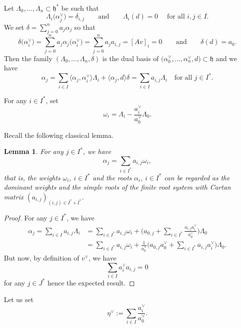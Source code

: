 \documentclass[pdftex]{sigma}
\newtheorem{Lemma}[Theorem]{Lemma}
\numberwithin{equation}{section}
\newcommand{\al}{\alpha}
\newcommand{\La}{\Lambda}
\newcommand{\fh}{\mathfrak{h}}
\newcommand{\scal}[2]{\langle #1,#2\rangle}
\begin{document}
Let $\La_0,\dots,\La_{n}\subset \fh^\ast$ be such that
\[
\La_i\bigl(\al^\vee_j\bigr) = \delta_{i,j} \qquad\text{and}\qquad \La_i(d) = 0\quad \text{ for all $i,j\in I$.}
\]
We set $\delta = \sum_{j=0}^{n} a_j \al_j$ so that
\[
\delta\bigl(\al_i^\vee\bigr) = \sum_{j=0}^n a_j \al_j\bigl(\al_i^\vee\bigr)=\sum_{j=0}^n a_j a_{i,j} = [Av]_{i} =0\qquad \text{and} \qquad \delta(d) = a_0.
\]
Then the family $(\La_0,\dots,\La_n,\delta)$ is the dual basis of $\bigl(\al^\vee_0,\dots,\al^\vee_n,d\bigr)\subset \fh$ and we have
\[
\al_j = \sum_{i\in I} \bigl\langle\al_j,\al_i^\vee\bigr\rangle \La_i + \scal{\al_j}{d}\delta = \sum_{i\in I} a_{i,j} \La_i \quad \text{for all $j\in I^\ast$.}
\]

\smallskip

For any $i\in I^{\ast}$, set%
\[
\omega_{i}=\Lambda_{i}-\frac{a_{i}^{\vee}}{a_{0}^{\vee}}\Lambda_{0}.
\]

Recall the following classical lemma.

\begin{Lemma}
	For any $j\in I^{\ast}$, we have
	\[
	\alpha_{j}=\sum_{i\in I^{\ast}}a_{i,j}\omega_{i},%
	\]
	that is, the weights $\omega_{i}$, $i\in I^{\ast}$ and the roots $\alpha_{i}$, $i\in
	I^{\ast}$ can be regarded as the dominant weights and the simple roots of the
	finite root system with Cartan matrix $(a_{i,j})_{(i,j)\in I^{\ast}\times
		I^{\ast}}$.
\end{Lemma}

\begin{proof}
For any $j\in I^{\ast}$, we have%
\begin{align*}
\alpha_{j}=\sum_{i\in I}a_{i,j}\Lambda_{i}&{}=\sum_{i\in I^{\ast}}a_{i,j}%
\omega_{i}+\Biggl( a_{0,j}+\sum_{i\in I^{\ast}}\frac{a_{i,j}a_{i}^{\vee}%
}{a_{0}^{\vee}}\Biggr) \Lambda_{0}\\
&{}=
\sum_{i\in I^{\ast}}a_{i,j}\omega_{i}+\frac{1}{a_{0}^{\vee}}\Biggl(
a_{0,j}a_{0}^{\vee}+\sum_{i\in I^{\ast}}a_{i,j}a_{i}^{\vee}\Biggr)
\Lambda_{0}.
\end{align*}
But now, by definition of $v^{\vee}$, we have%
\[
\sum_{i\in I}a_{i}^{\vee}a_{i,j}=0
\]
for any $j\in J^{\ast}$ hence the expected result.
\end{proof}

Let us set%
\[
\eta^{\vee}:=\sum_{i\in I}\frac{a_{i}^{\vee}}{a_{0}^{\vee}}.
\]
\end{document}

